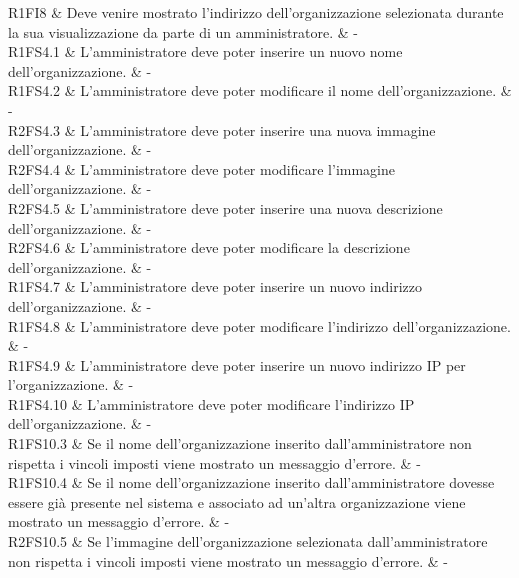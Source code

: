 R1FI8 & Deve venire mostrato l'indirizzo dell'organizzazione selezionata durante la sua visualizzazione da parte di un amministratore.  & - \\

R1FS4.1 & L'amministratore deve poter inserire un nuovo nome dell'organizzazione. & - \\

R1FS4.2 & L'amministratore deve poter modificare il nome dell'organizzazione. & - \\

R2FS4.3 & L'amministratore deve poter inserire una nuova immagine dell'organizzazione. & - \\

R2FS4.4 & L'amministratore deve poter modificare l'immagine dell'organizzazione. & - \\

R2FS4.5 & L'amministratore deve poter inserire una nuova descrizione dell'organizzazione.  & - \\

R2FS4.6 & L'amministratore deve poter modificare la descrizione dell'organizzazione.  & - \\

R1FS4.7 & L'amministratore deve poter inserire un nuovo indirizzo dell'organizzazione. & - \\

R1FS4.8 & L'amministratore deve poter modificare l'indirizzo dell'organizzazione.  & - \\

R1FS4.9 & L'amministratore deve poter inserire un nuovo indirizzo IP per l'organizzazione.  & - \\

R1FS4.10 & L'amministratore deve poter modificare l'indirizzo IP dell'organizzazione.  & - \\

R1FS10.3 & Se il nome dell'organizzazione inserito dall'amministratore non rispetta i vincoli imposti viene mostrato un messaggio d'errore.  & - \\

R1FS10.4 & Se il nome dell'organizzazione inserito dall'amministratore dovesse essere già presente nel sistema e associato ad un'altra organizzazione viene mostrato un messaggio d'errore.  & - \\

R2FS10.5 & Se l'immagine dell'organizzazione selezionata dall'amministratore non rispetta i vincoli imposti viene mostrato un messaggio d'errore. & - \\

